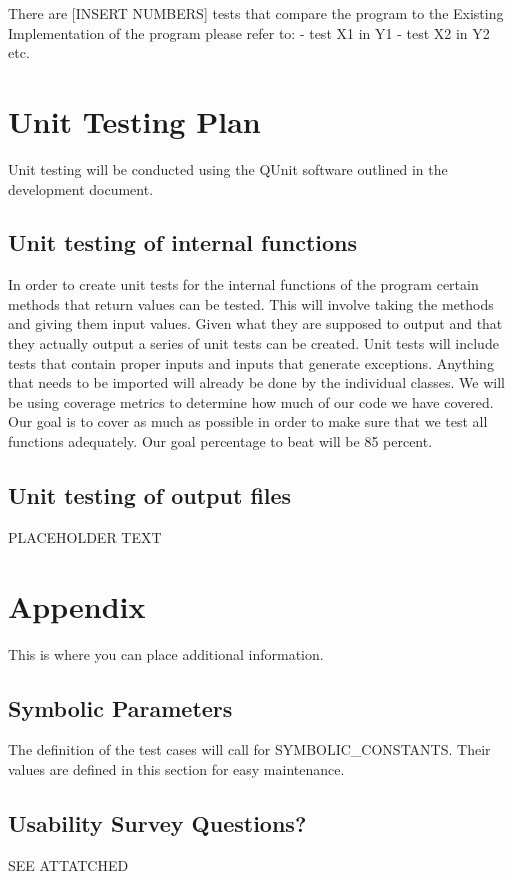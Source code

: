 \documentclass[12pt, titlepage]{article}
\begin{document}
There are [INSERT NUMBERS] tests that compare the program to the Existing Implementation of the program please refer to:
- test X1 in Y1
- test X2 in Y2
etc.
				
\section{Unit Testing Plan}

Unit testing will be conducted using the QUnit software outlined in the development document.
		
\subsection{Unit testing of internal functions}

In order to create unit tests for the internal functions of the program certain methods that return values
can be tested. This will involve taking the methods and giving them input values. Given what they are
supposed to output and that they actually output a series of unit tests can be created. Unit tests will include
tests that contain proper inputs and inputs that generate exceptions.  Anything that needs to be imported will already be done
by the individual classes. We will be using coverage metrics to determine how much of our code we have
covered. Our goal is to cover as much as possible in order to make sure that we test all functions adequately.
Our goal percentage to beat will be 85 percent.
		
\subsection{Unit testing of output files}		

PLACEHOLDER TEXT





\newpage

\section{Appendix}

This is where you can place additional information.

\subsection{Symbolic Parameters}

The definition of the test cases will call for SYMBOLIC\_CONSTANTS.
Their values are defined in this section for easy maintenance.

\subsection{Usability Survey Questions?}

SEE ATTATCHED
\end{document}
